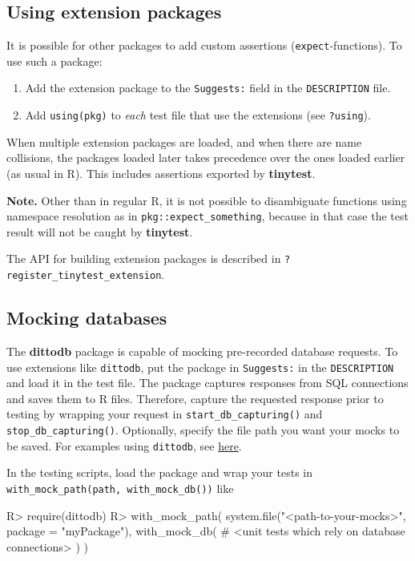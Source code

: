 \documentclass[11pt]{article}
\newcommand{\code}[1]{\texttt{#1}}
\newcommand{\pkg}[1]{\textbf{#1}}
\let\oldmarginpar\marginpar
\renewcommand{\marginpar}[1]{\oldmarginpar{\color{bluetext}\raggedleft\scriptsize #1}}
\begin{document}
\subsection{Using extension packages}

It is possible for other packages to add custom assertions
(\code{expect}-functions).  To use such a package:
\begin{enumerate}
\item Add the extension package to the \code{Suggests:} field in the \code{DESCRIPTION} file.
\item Add \code{using(pkg)} to \emph{each} test file that use the extensions (see \code{?using}). \marginpar{\code{using}}
\end{enumerate}

When multiple extension packages are loaded, and when there are name
collisions, the packages loaded later takes precedence over the ones loaded
earlier (as usual in R). This includes assertions exported by \pkg{tinytest}.

\textbf{Note.} Other than in regular R, it is not possible to disambiguate
functions using namespace resolution as in \code{pkg::expect\_something},
because in that case the test result will not be caught by \pkg{tinytest}.

The API for building extension packages is described in \code{?register\_tinytest\_extension}.


\subsection{Mocking databases}

The \pkg{dittodb} package\cite{keane2020dittodb} is capable of mocking
pre-recorded database requests. 
To use extensions like \code{dittodb}, put the package in \code{Suggests:} in
the \code{DESCRIPTION} and load it in the test file. The package captures
responses from SQL connections and saves them to R files. Therefore, capture
the requested response prior to testing by wrapping your request in
\code{start\_db\_capturing()} and \code{stop\_db\_capturing()}. Optionally, specify
the file path you want your mocks to be saved. For examples using
\code{dittodb}, see \href{https://dittodb.jonkeane.com/}{here}.

In the testing scripts, load the package and wrap your tests in
\code{with\_mock\_path(path, with\_mock\_db())} like
\begin{Schunk}
\begin{Sinput}
R> require(dittodb)
R> with_mock_path(
       system.file("<path-to-your-mocks>", package = "myPackage"),
       with_mock_db({
       # <unit tests which rely on database connections>
       })
   )
\end{Sinput}
\end{Schunk}
\end{document}
